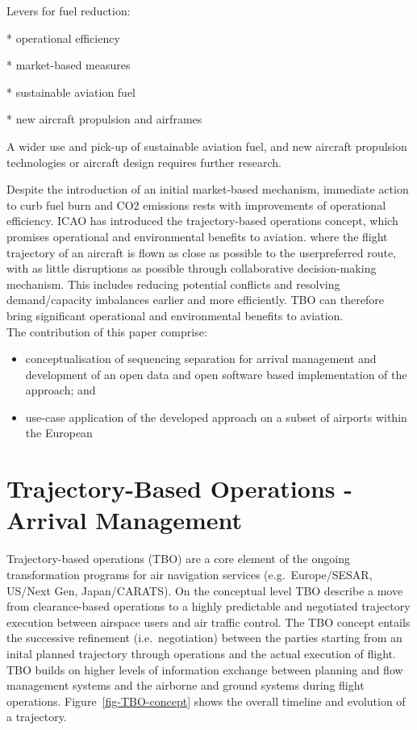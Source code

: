 \documentclass[letterpaper, 10 pt, journal, twoside]{IEEEtran}
\begin{document}
Levers for fuel reduction:

* operational efficiency

* market-based measures

* sustainable aviation fuel

* new aircraft propulsion and airframes

A wider use and pick-up of sustainable aviation fuel, and new aircraft
propulsion technologies or aircraft design requires further research.

Despite the introduction of an initial market-based mechanism, immediate
action to curb fuel burn and CO2 emissions rests with improvements of
operational efficiency. ICAO has introduced the trajectory-based
operations concept, which promises operational and environmental
benefits to aviation. where the flight trajectory of an aircraft is
flown as close as possible to the userpreferred route, with as little
disruptions as possible through collaborative decision-making mechanism.
This includes reducing potential conflicts and resolving demand/capacity
imbalances earlier and more efficiently. TBO can therefore bring
significant operational and environmental benefits to aviation.\\

The contribution of this paper comprise:

\begin{itemize}
\item
  conceptualisation of sequencing separation for arrival management and
  development of an open data and open software based implementation of
  the approach; and
\item
  use-case application of the developed approach on a subset of airports
  within the European
\end{itemize}

\hypertarget{trajectory-based-operations---arrival-management}{%
\section{Trajectory-Based Operations - Arrival
Management}\label{trajectory-based-operations---arrival-management}}

Trajectory-based operations (TBO) are a core element of the ongoing
transformation programs for air navigation services (e.g.~Europe/SESAR,
US/Next Gen, Japan/CARATS). On the conceptual level TBO describe a move
from clearance-based operations to a highly predictable and negotiated
trajectory execution between airspace users and air traffic control. The
TBO concept entails the successive refinement (i.e.~negotiation) between
the parties starting from an inital planned trajectory through
operations and the actual execution of flight. TBO builds on higher
levels of information exchange between planning and flow management
systems and the airborne and ground systems during flight operations.
Figure~\ref{fig-TBO-concept} shows the overall timeline and evolution of
a trajectory.
\end{document}
